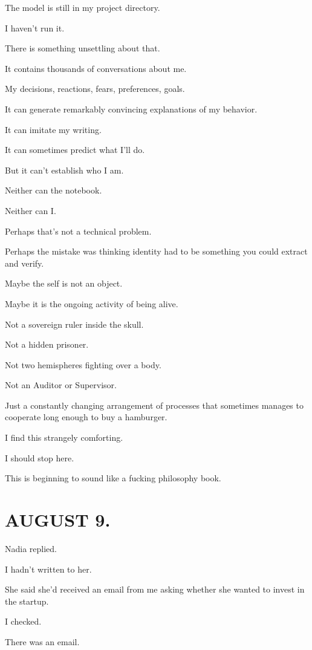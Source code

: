 \documentclass[11pt,oneside]{book}
\begin{document}
The model is still in my project directory.

I haven't run it.

There is something unsettling about that.

It contains thousands of conversations about me.

My decisions, reactions, fears, preferences, goals.

It can generate remarkably convincing explanations of my behavior.

It can imitate my writing.

It can sometimes predict what I'll do.

But it can't establish who I am.

Neither can the notebook.

Neither can I.

Perhaps that's not a technical problem.

Perhaps the mistake was thinking identity had to be something you could extract and verify.

Maybe the self is not an object.

Maybe it is the ongoing activity of being alive.

Not a sovereign ruler inside the skull.

Not a hidden prisoner.

Not two hemispheres fighting over a body.

Not an Auditor or Supervisor.

Just a constantly changing arrangement of processes that sometimes manages to cooperate long enough to buy a hamburger.

I find this strangely comforting.

I should stop here.

This is beginning to sound like a fucking philosophy book.

\section*{AUGUST 9.}

Nadia replied.

I hadn't written to her.

She said she'd received an email from me asking whether she wanted to invest in the startup.

I checked.

There was an email.
\end{document}
